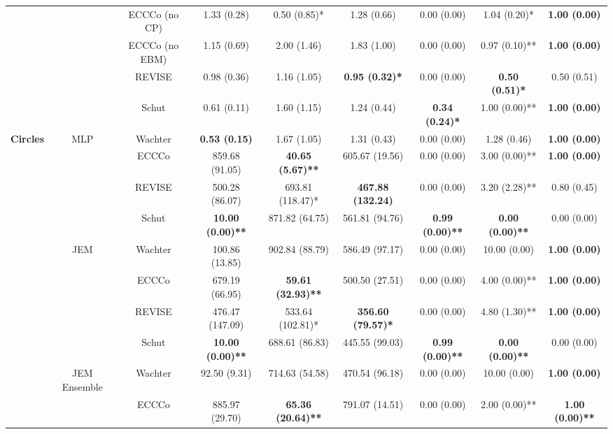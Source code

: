 \begin{table}
{\begin{tabular}[t]{>{}c|c|c|c|c|c|c|c|c}
 &  & ECCCo (no CP) & 1.33 (0.28) & 0.50 (0.85)* & 1.28 (0.66) & 0.00 (0.00) & 1.04 (0.20)* & \textbf{1.00 (0.00)}\\

 &  & ECCCo (no EBM) & 1.15 (0.69) & 2.00 (1.46) & 1.83 (1.00) & 0.00 (0.00) & 0.97 (0.10)** & \textbf{1.00 (0.00)}\\

 &  & REVISE & 0.98 (0.36) & 1.16 (1.05) & \textbf{0.95 (0.32)*} & 0.00 (0.00) & \textbf{0.50 (0.51)*} & 0.50 (0.51)\\

 &  & Schut & 0.61 (0.11) & 1.60 (1.15) & 1.24 (0.44) & \textbf{0.34 (0.24)*} & 1.00 (0.00)** & \textbf{1.00 (0.00)}\\

\multirow{-12}{*}{\centering\arraybackslash \textbf{Circles}} & \multirow{-6}{*}{\centering\arraybackslash MLP} & Wachter & \textbf{0.53 (0.15)} & 1.67 (1.05) & 1.31 (0.43) & 0.00 (0.00) & 1.28 (0.46) & \textbf{1.00 (0.00)}\\
\cline{1-9}
 &  & ECCCo & 859.68 (91.05) & \textbf{40.65 (5.67)**} & 605.67 (19.56) & 0.00 (0.00) & 3.00 (0.00)** & \textbf{1.00 (0.00)}\\

 &  & REVISE & 500.28 (86.07) & 693.81 (118.47)* & \textbf{467.88 (132.24)} & 0.00 (0.00) & 3.20 (2.28)** & 0.80 (0.45)\\

 &  & Schut & \textbf{10.00 (0.00)**} & 871.82 (64.75) & 561.81 (94.76) & \textbf{0.99 (0.00)**} & \textbf{0.00 (0.00)**} & 0.00 (0.00)\\

 & \multirow{-4}{*}{\centering\arraybackslash JEM} & Wachter & 100.86 (13.85) & 902.84 (88.79) & 586.49 (97.17) & 0.00 (0.00) & 10.00 (0.00) & \textbf{1.00 (0.00)}\\
\cline{2-9}
 &  & ECCCo & 679.19 (66.95) & \textbf{59.61 (32.93)**} & 500.50 (27.51) & 0.00 (0.00) & 4.00 (0.00)** & \textbf{1.00 (0.00)}\\

 &  & REVISE & 476.47 (147.09) & 533.64 (102.81)* & \textbf{356.60 (79.57)*} & 0.00 (0.00) & 4.80 (1.30)** & \textbf{1.00 (0.00)}\\

 &  & Schut & \textbf{10.00 (0.00)**} & 688.61 (86.83) & 445.55 (99.03) & \textbf{0.99 (0.00)**} & \textbf{0.00 (0.00)**} & 0.00 (0.00)\\

 & \multirow{-4}{*}{\centering\arraybackslash JEM Ensemble} & Wachter & 92.50 (9.31) & 714.63 (54.58) & 470.54 (96.18) & 0.00 (0.00) & 10.00 (0.00) & \textbf{1.00 (0.00)}\\
\cline{2-9}
 &  & ECCCo & 885.97 (29.70) & \textbf{65.36 (20.64)**} & 791.07 (14.51) & 0.00 (0.00) & 2.00 (0.00)** & \textbf{1.00 (0.00)**}\\


\end{tabular}}
\end{table}
